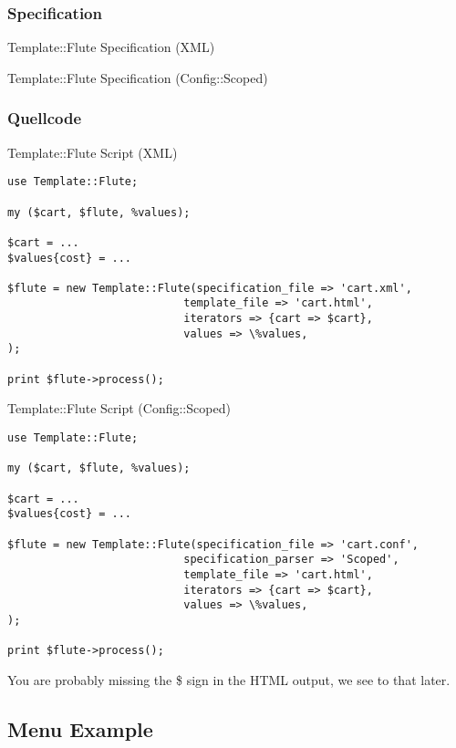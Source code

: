 \subsubsection{Specification}
\begin{frame}[fragile]{Template::Flute Specification (XML)}

\end{frame}
\begin{frame}[fragile]{Template::Flute Specification (Config::Scoped)}

\end{frame}
\subsubsection{Quellcode}
\begin{frame}[fragile]{Template::Flute Script (XML)}
\begin{lstlisting}
use Template::Flute;

my ($cart, $flute, %values);

$cart = ...
$values{cost} = ...

$flute = new Template::Flute(specification_file => 'cart.xml',
                           template_file => 'cart.html',
                           iterators => {cart => $cart},
                           values => \%values,
);

print $flute->process();
\end{lstlisting}
\end{frame}

\begin{frame}[fragile]{Template::Flute Script (Config::Scoped)}
\begin{lstlisting}
use Template::Flute;

my ($cart, $flute, %values);

$cart = ...
$values{cost} = ...

$flute = new Template::Flute(specification_file => 'cart.conf',
                           specification_parser => 'Scoped',
                           template_file => 'cart.html',
                           iterators => {cart => $cart},
                           values => \%values,
);

print $flute->process();
\end{lstlisting}
\end{frame}

You are probably missing the \$ sign in the HTML output, we see
to that later.

\subsection{Menu Example}
